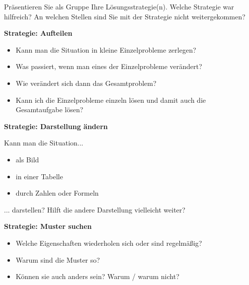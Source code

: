 \documentclass[11pt, a4paper, oneside]{article}
\begin{document}
	Präsentieren Sie als Gruppe Ihre Lösungsstrategie(n).
	Welche Strategie war hilfreich?
	An welchen Stellen sind Sie mit der Strategie nicht weitergekommen?
	
	\pagebreak
	
	\begin{landscape}
		\begin{center}
			\fontsize{30pt}{10pt}\selectfont
			\vspace*{2cm}
			\textbf{Strategie: Aufteilen}
		\end{center}
		
		\vspace{2cm}
		\huge
		\begin{itemize}
			\item Kann man die Situation in kleine Einzelprobleme zerlegen?
			\item Was passiert, wenn man eines der Einzelprobleme verändert?
			\item Wie verändert sich dann das Gesamtproblem?
			\item Kann ich die Einzelprobleme einzeln lösen und damit auch die Gesamtaufgabe lösen?
		\end{itemize}
	\end{landscape}

	\pagebreak
	
	\begin{landscape}
		\begin{center}
			\fontsize{30pt}{10pt}\selectfont
			\vspace*{2cm}
			\textbf{Strategie: Darstellung ändern}
		\end{center}
	
		\vspace{2cm}
		\huge
		Kann man die Situation...
		\begin{itemize}
			\item als Bild
			\item in einer Tabelle
			\item durch Zahlen oder Formeln
		\end{itemize}
		... darstellen? Hilft die andere Darstellung vielleicht weiter?
	\end{landscape}

	\begin{landscape}
		\begin{center}
			\fontsize{30pt}{10pt}\selectfont
			\vspace*{2cm}
			\textbf{Strategie: Muster suchen}
		\end{center}
		
		\vspace{2cm}
		\huge
		\begin{itemize}
			\item Welche Eigenschaften wiederholen sich oder sind regelmäßig?
			\item Warum sind die Muster so?
			\item Können sie auch anders sein? Warum / warum nicht?
		\end{itemize}
	\end{landscape}
\end{document}
